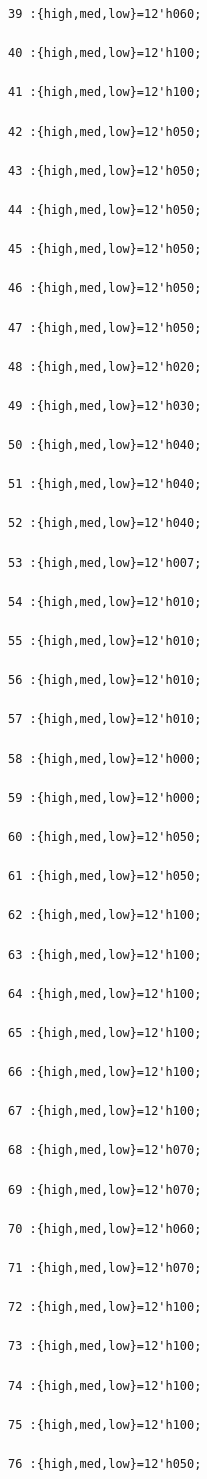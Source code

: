 \documentclass[UTF8]{ctexart}
\begin{document}
\begin{verbatim}
39 :{high,med,low}=12'h060;

40 :{high,med,low}=12'h100;

41 :{high,med,low}=12'h100;

42 :{high,med,low}=12'h050;

43 :{high,med,low}=12'h050;

44 :{high,med,low}=12'h050;

45 :{high,med,low}=12'h050;

46 :{high,med,low}=12'h050;

47 :{high,med,low}=12'h050;

48 :{high,med,low}=12'h020;

49 :{high,med,low}=12'h030;

50 :{high,med,low}=12'h040;

51 :{high,med,low}=12'h040;

52 :{high,med,low}=12'h040;

53 :{high,med,low}=12'h007;

54 :{high,med,low}=12'h010;

55 :{high,med,low}=12'h010;

56 :{high,med,low}=12'h010;

57 :{high,med,low}=12'h010;

58 :{high,med,low}=12'h000;

59 :{high,med,low}=12'h000;

60 :{high,med,low}=12'h050;

61 :{high,med,low}=12'h050;

62 :{high,med,low}=12'h100;

63 :{high,med,low}=12'h100;

64 :{high,med,low}=12'h100;

65 :{high,med,low}=12'h100;

66 :{high,med,low}=12'h100;

67 :{high,med,low}=12'h100;

68 :{high,med,low}=12'h070;

69 :{high,med,low}=12'h070;

70 :{high,med,low}=12'h060;

71 :{high,med,low}=12'h070;

72 :{high,med,low}=12'h100;

73 :{high,med,low}=12'h100;

74 :{high,med,low}=12'h100;

75 :{high,med,low}=12'h100;

76 :{high,med,low}=12'h050;


\end{verbatim}
\end{document}
